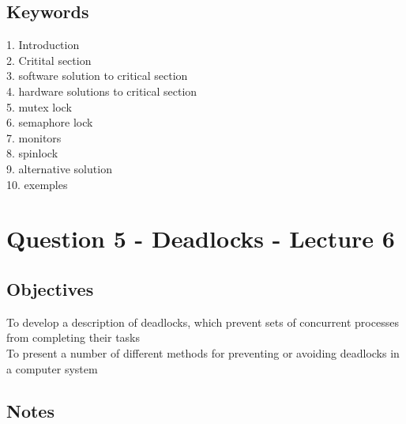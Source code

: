 \documentclass[a4paper,10pt,titlepage]{report}
\begin{document}
\subsection{Keywords}
1. Introduction\\
2. Critital section\\
3. software solution to critical section\\
4. hardware solutions to critical section\\
5. mutex lock\\
6. semaphore lock\\
7. monitors\\
8. spinlock\\
9. alternative solution\\
10. exemples\\

\newpage
\section{Question 5 - Deadlocks - Lecture 6}
\subsection{Objectives}
To develop a description of deadlocks, which prevent sets of concurrent
processes from completing their tasks\\
To present a number of different methods for preventing or avoiding
deadlocks in a computer system\\
\subsection{Notes}
\end{document}
